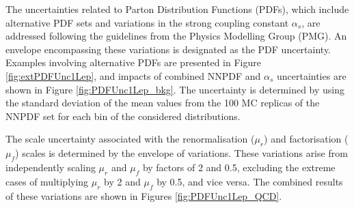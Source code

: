 The uncertainties related to Parton Distribution Functions (PDFs), which include alternative PDF sets and variations in the strong coupling constant $\alpha_s$, are addressed following the guidelines from the Physics Modelling Group (PMG).
An envelope encompassing these variations is designated as the PDF uncertainty.
Examples involving alternative PDFs are presented in Figure \ref{fig:extPDFUnc1Lep},
and impacts of combined NNPDF and $\alpha_s$ uncertainties are shown in Figure \ref{fig:PDFUnc1Lep_bkg}.
The uncertainty is determined by using the standard deviation of the mean values from the 100 MC replicas of the NNPDF set for each bin of the considered distributions.

The scale uncertainty associated with the renormalisation ($\mu_r$) and factorisation ($\mu_f$) scales is determined by the envelope of variations. 
These variations arise from independently scaling $\mu_r$ and $\mu_f$ by factors of 2 and 0.5, 
excluding the extreme cases of multiplying $\mu_r$ by 2 and $\mu_f$ by 0.5, and vice versa.
The combined results of these variations are shown in Figures \ref{fig:PDFUnc1Lep_QCD}.


